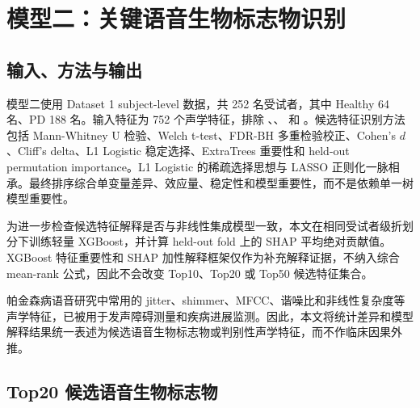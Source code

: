 \section{模型二：关键语音生物标志物识别}

\subsection{输入、方法与输出}

模型二使用 Dataset 1 subject-level 数据，共 252 名受试者，其中 Healthy 64 名、PD 188 名。输入特征为 752 个声学特征，排除 、、 和 。候选特征识别方法包括 Mann-Whitney U 检验、Welch t-test、FDR-BH 多重检验校正、Cohen's \(d\)、Cliff's delta、L1 Logistic 稳定选择、ExtraTrees 重要性和 held-out permutation importance。L1 Logistic 的稀疏选择思想与 LASSO 正则化一脉相承。最终排序综合单变量差异、效应量、稳定性和模型重要性，而不是依赖单一树模型重要性。

为进一步检查候选特征解释是否与非线性集成模型一致，本文在相同受试者级折划分下训练轻量 XGBoost，并计算 held-out fold 上的 SHAP 平均绝对贡献值。XGBoost 特征重要性和 SHAP 加性解释框架仅作为补充解释证据，不纳入综合 mean-rank 公式，因此不会改变 Top10、Top20 或 Top50 候选特征集合。

帕金森病语音研究中常用的 jitter、shimmer、MFCC、谐噪比和非线性复杂度等声学特征，已被用于发声障碍测量和疾病进展监测。因此，本文将统计差异和模型解释结果统一表述为候选语音生物标志物或判别性声学特征，而不作临床因果外推。

\subsection{Top20 候选语音生物标志物}

